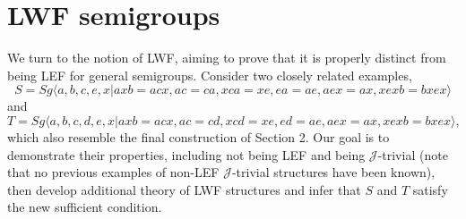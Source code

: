 \documentclass{article}
\theoremstyle{definition}
\def\J{\mathcal J}
\begin{document}
\section{LWF semigroups}

We turn to the notion of LWF, aiming to prove that it is properly distinct from being LEF for general semigroups. Consider two closely related examples, $$S = Sg \langle a,b,c,e,x | axb = acx, ac = ca, xca = xe, ea = ae, aex = ax, xexb = bxex \rangle$$ and $$T = Sg \langle a,b,c,d,e,x | axb = acx, ac = cd, xcd = xe, ed = ae, aex = ax, xexb = bxex \rangle,$$ which also resemble the final construction of Section 2. Our goal is to demonstrate their properties, including not being LEF and being $\J$-trivial (note that no previous examples of non-LEF $\J$-trivial structures have been known), then develop additional theory of LWF structures and infer that $S$ and $T$ satisfy the new sufficient condition.
\end{document}
